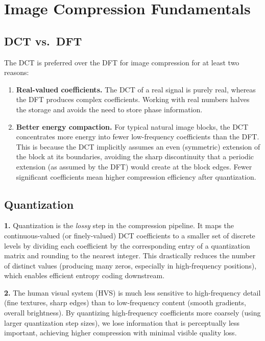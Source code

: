 \documentclass[11pt,a4paper]{article}
\begin{document}
\section{Image Compression Fundamentals}

\subsection{DCT vs.\ DFT}

The DCT is preferred over the DFT for image compression for at least two reasons:

\begin{enumerate}[nosep]
  \item \textbf{Real-valued coefficients.}  The DCT of a real signal is purely real, whereas the DFT produces complex coefficients.  Working with real numbers halves the storage and avoids the need to store phase information.
  \item \textbf{Better energy compaction.}  For typical natural image blocks, the DCT concentrates more energy into fewer low-frequency coefficients than the DFT.  This is because the DCT implicitly assumes an even (symmetric) extension of the block at its boundaries, avoiding the sharp discontinuity that a periodic extension (as assumed by the DFT) would create at the block edges.  Fewer significant coefficients mean higher compression efficiency after quantization.
\end{enumerate}

\subsection{Quantization}

\textbf{1.} Quantization is the \emph{lossy} step in the compression pipeline.  It maps the continuous-valued (or finely-valued) DCT coefficients to a smaller set of discrete levels by dividing each coefficient by the corresponding entry of a quantization matrix and rounding to the nearest integer.  This drastically reduces the number of distinct values (producing many zeros, especially in high-frequency positions), which enables efficient entropy coding downstream.

\medskip
\textbf{2.} The human visual system (HVS) is much less sensitive to high-frequency detail (fine textures, sharp edges) than to low-frequency content (smooth gradients, overall brightness).  By quantizing high-frequency coefficients more coarsely (using larger quantization step sizes), we lose information that is perceptually less important, achieving higher compression with minimal visible quality loss.
\end{document}

